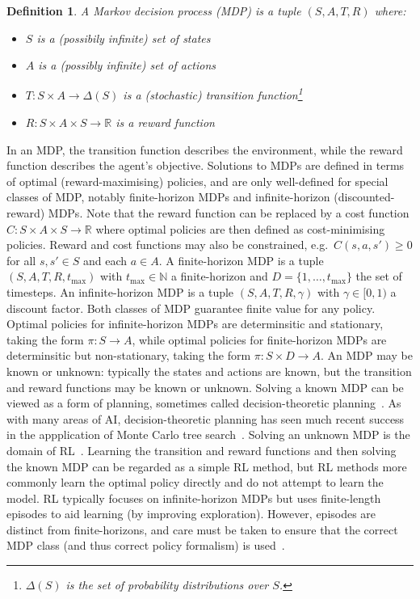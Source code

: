 \documentclass[10pt]{article}
\theoremstyle{plain}
\newtheorem{definition}{Definition}
\begin{document}
\begin{definition}
    A Markov decision process (MDP) is a tuple $(S, A, T, R)$ where:
    \begin{itemize}
        \item $S$ is a (possibily infinite) set of states
        \item $A$ is a (possibly infinite) set of actions
        \item $T : S \times A \to \Delta(S)$ is a (stochastic) transition function\footnote{$\Delta(S)$ is the set of probability distributions over $S$.}
        \item $R : S \times A \times S \to \mathbb{R}$ is a reward function
    \end{itemize}
\end{definition}

In an MDP, the transition function describes the environment, while the reward function describes the agent's objective.
Solutions to MDPs are defined in terms of optimal (reward-maximising) policies, and are only well-defined for special classes of MDP, notably finite-horizon MDPs and infinite-horizon (discounted-reward) MDPs.
Note that the reward function can be replaced by a cost function $C : S \times A \times S \to \mathbb{R}$ where optimal policies are then defined as cost-minimising policies.
Reward and cost functions may also be constrained, e.g.\ $C(s, a, s') \ge 0$ for all $s, s' \in S$ and each $a \in A$.
A finite-horizon MDP is a tuple $(S, A, T, R, t_{\max})$ with $t_{\max} \in \mathbb{N}$ a finite-horizon and $D = \{ 1, \dots, t_{\max} \}$ the set of timesteps.
An infinite-horizon MDP is a tuple $(S, A, T, R, \gamma)$ with $\gamma \in [0, 1)$ a discount factor.
Both classes of MDP guarantee finite value for any policy.
Optimal policies for infinite-horizon MDPs are determinsitic and stationary, taking the form $\pi : S \to A$, while optimal policies for finite-horizon MDPs are determinsitic but non-stationary, taking the form $\pi : S \times D \to A$.
An MDP may be known or unknown: typically the states and actions are known, but the transition and reward functions may be known or unknown.
Solving a known MDP can be viewed as a form of planning, sometimes called decision-theoretic planning~\cite{Kolobov:book:2012}.
As with many areas of AI, decision-theoretic planning has seen much recent success in the appplication of Monte Carlo tree search~\cite{Keller:ICAPS:2012}.
Solving an unknown MDP is the domain of RL~\cite{Sutton:book:2018}.
Learning the transition and reward functions and then solving the known MDP can be regarded as a simple RL method, but RL methods more commonly learn the optimal policy directly and do not attempt to learn the model.
RL typically focuses on infinite-horizon MDPs but uses finite-length episodes to aid learning (by improving exploration).
However, episodes are distinct from finite-horizons, and care must be taken to ensure that the correct MDP class (and thus correct policy formalism) is used~\cite{Pardo:ICML:2018}.
\end{document}
